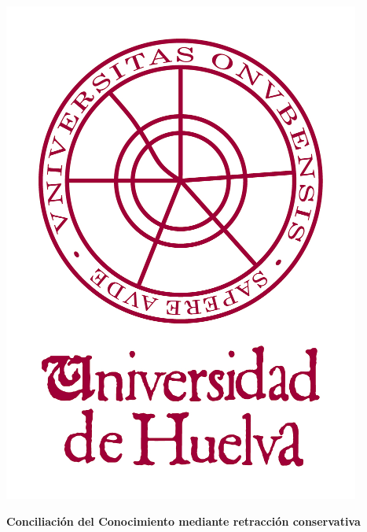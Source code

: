 \thispagestyle{empty}
\begin{center}
\includegraphics[scale=0.4]{./00_Titulo/figs/logoUHU}
\end{center}
\vspace*{0cm}
\Large 
%

\vspace{2cm}

\LARGE

\begin{center}
{\bf  Conciliación del Conocimiento mediante retracción conservativa}
\end{center} 

\Large





